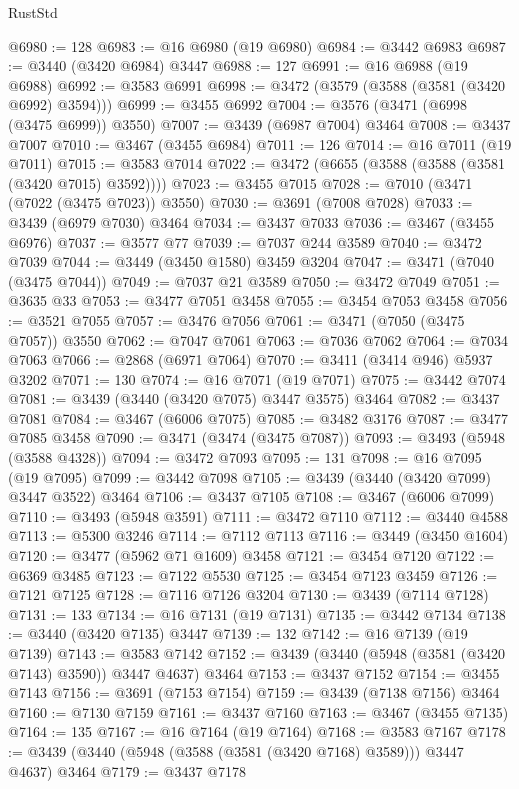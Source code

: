 \begin{lexlean}{RustStd}
\begin{coremodule}
{{{{{{{{{{{{{{{{{{{@6980 := 128
@6983 := @16 @6980 (@19 @6980)
@6984 := @3442 @6983
@6987 := @3440 (@3420 @6984) @3447
@6988 := 127
@6991 := @16 @6988 (@19 @6988)
@6992 := @3583 @6991
@6998 := @3472 (@3579 (@3588 (@3581 (@3420 @6992) @3594)))
@6999 := @3455 @6992
@7004 := @3576 (@3471 (@6998 (@3475 @6999)) @3550)
@7007 := @3439 (@6987 @7004) @3464
@7008 := @3437 @7007
@7010 := @3467 (@3455 @6984)
@7011 := 126
@7014 := @16 @7011 (@19 @7011)
@7015 := @3583 @7014
@7022 := @3472 (@6655 (@3588 (@3588 (@3581 (@3420 @7015) @3592))))
@7023 := @3455 @7015
@7028 := @7010 (@3471 (@7022 (@3475 @7023)) @3550)
@7030 := @3691 (@7008 @7028)
@7033 := @3439 (@6979 @7030) @3464
@7034 := @3437 @7033
@7036 := @3467 (@3455 @6976)
@7037 := @3577 @77
@7039 := @7037 @244 @3589
@7040 := @3472 @7039
@7044 := @3449 (@3450 @1580) @3459 @3204
@7047 := @3471 (@7040 (@3475 @7044))
@7049 := @7037 @21 @3589
@7050 := @3472 @7049
@7051 := @3635 @33
@7053 := @3477 @7051 @3458
@7055 := @3454 @7053 @3458
@7056 := @3521 @7055
@7057 := @3476 @7056
@7061 := @3471 (@7050 (@3475 @7057)) @3550
@7062 := @7047 @7061
@7063 := @7036 @7062
@7064 := @7034 @7063
@7066 := @2868 (@6971 @7064)
@7070 := @3411 (@3414 @946) @5937 @3202
@7071 := 130
@7074 := @16 @7071 (@19 @7071)
@7075 := @3442 @7074
@7081 := @3439 (@3440 (@3420 @7075) @3447 @3575) @3464
@7082 := @3437 @7081
@7084 := @3467 (@6006 @7075)
@7085 := @3482 @3176
@7087 := @3477 @7085 @3458
@7090 := @3471 (@3474 (@3475 @7087))
@7093 := @3493 (@5948 (@3588 @4328))
@7094 := @3472 @7093
@7095 := 131
@7098 := @16 @7095 (@19 @7095)
@7099 := @3442 @7098
@7105 := @3439 (@3440 (@3420 @7099) @3447 @3522) @3464
@7106 := @3437 @7105
@7108 := @3467 (@6006 @7099)
@7110 := @3493 (@5948 @3591)
@7111 := @3472 @7110
@7112 := @3440 @4588
@7113 := @5300 @3246
@7114 := @7112 @7113
@7116 := @3449 (@3450 @1604)
@7120 := @3477 (@5962 @71 @1609) @3458
@7121 := @3454 @7120
@7122 := @6369 @3485
@7123 := @7122 @5530
@7125 := @3454 @7123 @3459
@7126 := @7121 @7125
@7128 := @7116 @7126 @3204
@7130 := @3439 (@7114 @7128)
@7131 := 133
@7134 := @16 @7131 (@19 @7131)
@7135 := @3442 @7134
@7138 := @3440 (@3420 @7135) @3447
@7139 := 132
@7142 := @16 @7139 (@19 @7139)
@7143 := @3583 @7142
@7152 := @3439 (@3440 (@5948 (@3581 (@3420 @7143) @3590)) @3447 @4637) @3464
@7153 := @3437 @7152
@7154 := @3455 @7143
@7156 := @3691 (@7153 @7154)
@7159 := @3439 (@7138 @7156) @3464
@7160 := @7130 @7159
@7161 := @3437 @7160
@7163 := @3467 (@3455 @7135)
@7164 := 135
@7167 := @16 @7164 (@19 @7164)
@7168 := @3583 @7167
@7178 := @3439 (@3440 (@5948 (@3588 (@3581 (@3420 @7168) @3589))) @3447 @4637) @3464
@7179 := @3437 @7178
}}}}}}}}}}}}}}}}}}}
\end{coremodule}
\end{lexlean}
